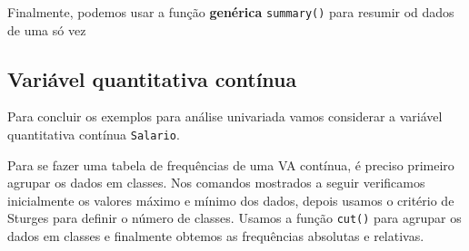 \documentclass[10pt,a4paper]{book}
\newenvironment{Shaded}{\begin{snugshade}}{\end{snugshade}}
\newcommand{\KeywordTok}[1]{\textcolor[rgb]{0.13,0.29,0.53}{\textbf{#1}}}
\newcommand{\StringTok}[1]{\textcolor[rgb]{0.31,0.60,0.02}{#1}}
\newcommand{\OperatorTok}[1]{\textcolor[rgb]{0.81,0.36,0.00}{\textbf{#1}}}
\newcommand{\NormalTok}[1]{#1}
\begin{document}
Finalmente, podemos usar a função \textbf{genérica} \texttt{summary()}
para resumir od dados de uma só vez

\begin{Shaded}
\end{Shaded}

\subsection{Variável quantitativa
contínua}\label{variuxe1vel-quantitativa-contuxednua}

Para concluir os exemplos para análise univariada vamos considerar a
variável quantitativa contínua \texttt{Salario}.

Para se fazer uma tabela de frequências de uma VA contínua, é preciso
primeiro agrupar os dados em classes. Nos comandos mostrados a seguir
verificamos inicialmente os valores máximo e mínimo dos dados, depois
usamos o critério de Sturges para definir o número de classes. Usamos a
função \texttt{cut()} para agrupar os dados em classes e finalmente
obtemos as frequências absolutas e relativas.
\end{document}
